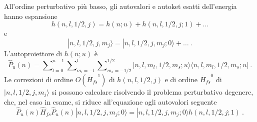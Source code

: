 \documentclass[12pt,a4paper]{report}
\numberwithin{equation}{section}
\numberwithin{section}{chapter}
\begin{document}
	All'ordine perturbativo pi\`u basso, gli autovalori e autoket esatti dell'energia hanno espansione
	\begin{equation}
	\label{impteo10}
	h(n,l,1/2,j) = h(n;u) + h(n,l,1/2,j;1) + \dots
	\end{equation}
	e
	\begin{equation}
	\label{impteo11}
	|n,l,1/2,j,m_j\rangle = |n,l,1/2,j,m_j;0\rangle + \dots~.
	\end{equation}
	L'autoproiettore di $h(n;u)$ \`e
	\begin{equation}
	\label{impteo12}
	\widehat{P}_u(n) = \sum\nolimits_{l=0}^{n-1}\sum\nolimits_{m_l=-l}^{l}\sum\nolimits_{m_s=-1/2}^{1/2} |n,l,m_l,1/2,m_s;u\rangle\langle n,l,m_l,1/2,m_s;u|~.
	\end{equation}
	Le correzioni di ordine $O({\overline{H}_{fs}}^1)$ di $h(n,l,1/2,j)$ e di ordine ${\overline{H}_{fs}}^0$ di $|n,l,1/2,j,m_j\rangle$ si possono calcolare risolvendo il problema perturbativo degenere, che, nel caso in esame, si riduce all'equazione agli autovalori seguente
	\begin{equation}
	\label{impteo13}
	\widehat{P}_u(n)\widehat{H}_{fs}\widehat{P}_u(n)|n,l,1/2,j,m_j;0\rangle = |n,l,1/2,j,m_j;0\rangle h(n,l,1/2,j;1)~.
	\end{equation}
\end{document}
